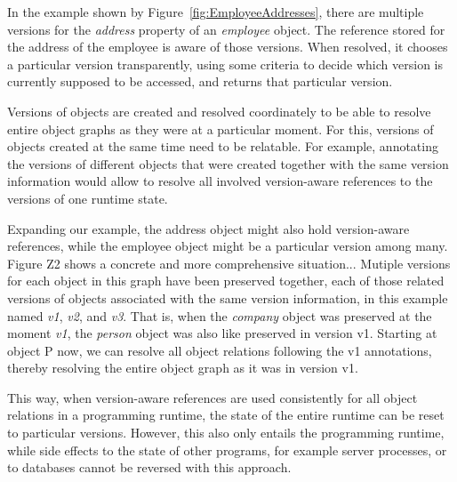 In the example shown by Figure~\ref{fig:EmployeeAddresses}, there are multiple versions for the \emph{address} property of an \emph{employee} object.
The reference stored for the address of the employee is aware of those versions.
When resolved, it chooses a particular version transparently, using some criteria to decide which version is currently supposed to be accessed, and returns that particular version.




Versions of objects are created and resolved coordinately to be able to resolve entire object graphs as they were at a particular moment.
For this, versions of objects created at the same time need to be relatable.
For example, annotating the versions of different objects that were created together with the same version information would allow to resolve all involved version-aware references to the versions of one runtime state.

Expanding our example, the address object might also hold version-aware references, while the employee object might be a particular version among many.
Figure Z2 shows a concrete and more comprehensive situation...
Mutiple versions for each object in this graph have been preserved together, each of those related versions of objects associated with the same version information, in this example named \emph{v1}, \emph{v2}, and \emph{v3}.
That is, when the \emph{company} object was preserved at the moment \emph{v1}, the \emph{person} object  was also like preserved in version v1.
Starting at object P now, we can resolve all object relations following the v1 annotations, thereby resolving the entire object graph as it was in version v1.


This way, when version-aware references are used consistently for all object relations in a programming runtime, the state of the entire runtime can be reset to particular versions.
However, this also only entails the programming runtime, while side effects to the state of other programs, for example server processes, or to databases cannot be reversed with this approach.

